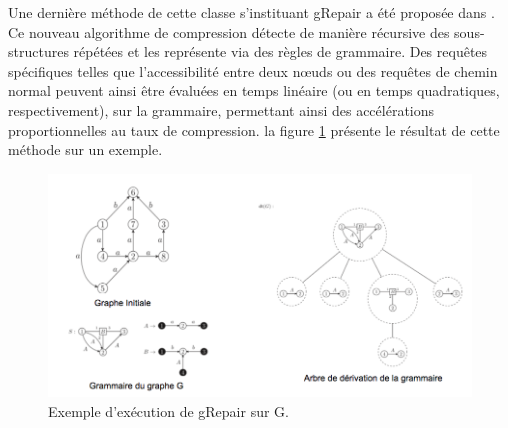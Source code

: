 
	Une dernière méthode de cette classe s'instituant gRepair a été proposée dans \citep{maneth2018grammar}. Ce nouveau algorithme de compression détecte de manière récursive des sous-structures répétées et les représente via des règles de grammaire.  Des requêtes spécifiques telles que l'accessibilité entre deux nœuds ou des requêtes de chemin normal peuvent ainsi être évaluées en temps linéaire (ou en temps quadratiques, respectivement), sur la grammaire, permettant ainsi des accélérations proportionnelles au taux de compression. la figure \ref{gRepair} présente le résultat de cette méthode sur un exemple. 
	
	\begin{figure}[h]
			\includegraphics[scale=0.5,center]{./ressources/image/grepair.png}
			\caption[Exemple d'exécution de gRepair sur G.]{Exemple d'exécution de gRepair sur G.}
			\label{gRepair}
	\end{figure}